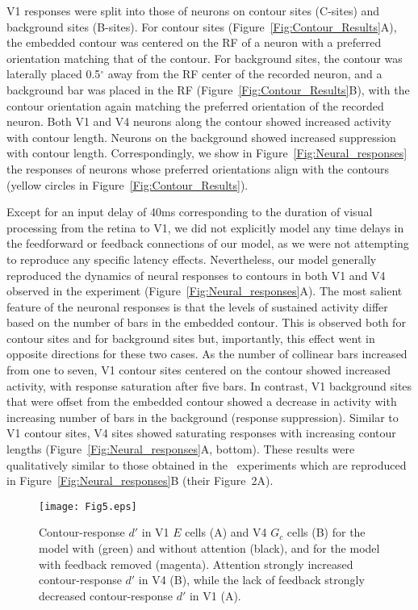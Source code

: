 V1 responses were split into those of neurons on contour sites
(C-sites) and background sites (B-sites). For contour sites
(Figure~\ref{Fig:Contour_Results}A), the embedded
contour was centered on the RF of a neuron with a preferred
orientation matching that of the contour. For background sites, the
contour was laterally placed 0.5$^{\circ}$ away from the RF center of the recorded neuron, and a background bar was placed in the RF
(Figure~\ref{Fig:Contour_Results}B), with the contour orientation
again matching the preferred orientation of the recorded neuron.
Both V1 and V4 neurons along the contour showed increased activity with contour length. Neurons on the background showed increased suppression with contour length.
%
Correspondingly, we 
 show in Figure~\ref{Fig:Neural_responses} the
responses of neurons whose preferred orientations align with the
contours
 (yellow circles in Figure~\ref{Fig:Contour_Results}).
%

Except for an input delay of 40ms corresponding to the duration of
visual processing from the retina to V1, we did not explicitly model
any time delays in the feedforward or feedback connections of
our model, as we were not attempting to reproduce 
any specific latency effects.
Nevertheless, our model generally reproduced the dynamics of neural
responses to contours in both V1 and V4 observed in the
\cite{Chen_etal14} experiment (Figure~\ref{Fig:Neural_responses}A).
The most salient feature of the neuronal responses is that the levels
of sustained activity differ based on the number of bars in the
embedded contour. This is observed both for contour sites and for
background sites but, importantly, this effect went in opposite
directions for these two cases.  As the number of collinear bars
increased from one to seven, V1 contour sites centered on the contour
showed increased activity, with response saturation after five
bars. In contrast, V1 background sites that were offset from the
embedded contour showed a decrease in activity with increasing number
of bars in the background (response suppression). Similar to V1
contour sites, V4 sites showed saturating responses with increasing
contour lengths (Figure~\ref{Fig:Neural_responses}A, bottom).  These
results were qualitatively similar to those obtained in
the~\cite{Chen_etal14} experiments which are reproduced in
Figure~\ref{Fig:Neural_responses}B (their Figure~2A).
%
\begin{figure*}
\begin{center}
\texttt{[image: Fig5.eps]}
\end{center}
\caption{Contour-response $d'$ in V1 $E$ cells (A) and V4 $G_c$ cells (B) for the model with (green) and without attention (black), and for the model with feedback removed 
(magenta). Attention strongly increased
  contour-response $d'$ in V4 (B), while the lack of feedback strongly
  decreased contour-response $d'$ in V1 (A).}
\label{Fig:FB_att}
\end{figure*}
%

